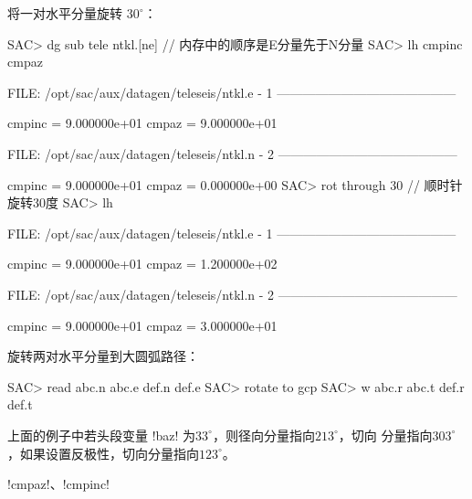 将一对水平分量旋转 $30^\circ$：
\begin{SACCode}
SAC> dg sub tele ntkl.[ne]          // 内存中的顺序是E分量先于N分量
SAC> lh cmpinc cmpaz

  FILE: /opt/sac/aux/datagen/teleseis/ntkl.e - 1
 ------------------------------------------

     cmpinc = 9.000000e+01
      cmpaz = 9.000000e+01

  FILE: /opt/sac/aux/datagen/teleseis/ntkl.n - 2
 ------------------------------------------

     cmpinc = 9.000000e+01
      cmpaz = 0.000000e+00
SAC> rot through 30                 // 顺时针旋转30度
SAC> lh

  FILE: /opt/sac/aux/datagen/teleseis/ntkl.e - 1
 ------------------------------------------

     cmpinc = 9.000000e+01
      cmpaz = 1.200000e+02

  FILE: /opt/sac/aux/datagen/teleseis/ntkl.n - 2
 ------------------------------------------

     cmpinc = 9.000000e+01
      cmpaz = 3.000000e+01
\end{SACCode}

旋转两对水平分量到大圆弧路径：
\begin{SACCode}
SAC> read abc.n abc.e def.n def.e
SAC> rotate to gcp
SAC> w abc.r abc.t def.r def.t
\end{SACCode}
上面的例子中若头段变量 !baz! 为$33^\circ$，则径向分量指向$213^\circ$，切向
分量指向$303^\circ$，如果设置反极性，切向分量指向$123^\circ$。

!cmpaz!、!cmpinc!
